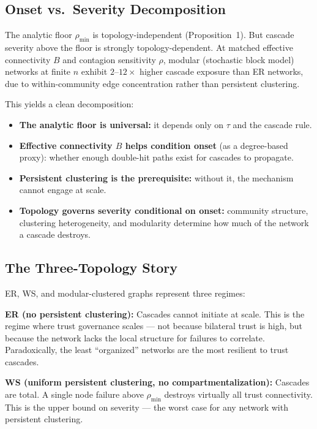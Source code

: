 \documentclass[11pt,a4paper]{article}
\begin{document}
\subsection{Onset vs.\ Severity Decomposition}

The analytic floor $\rho_{\min}$ is topology-independent (Proposition~1). But cascade severity above the floor is strongly topology-dependent. At matched effective connectivity $B$ and contagion sensitivity $\rho$, modular (stochastic block model) networks at finite $n$ exhibit $2$--$12\times$ higher cascade exposure than ER networks, due to within-community edge concentration rather than persistent clustering.

This yields a clean decomposition:

\begin{itemize}
\item \textbf{The analytic floor is universal:} it depends only on $\tau$ and the cascade rule.
\item \textbf{Effective connectivity $B$ helps condition onset} (as a degree-based proxy): whether enough double-hit paths exist for cascades to propagate.
\item \textbf{Persistent clustering is the prerequisite:} without it, the mechanism cannot engage at scale.
\item \textbf{Topology governs severity conditional on onset:} community structure, clustering heterogeneity, and modularity determine how much of the network a cascade destroys.
\end{itemize}

\subsection{The Three-Topology Story}

ER, WS, and modular-clustered graphs represent three regimes:

\textbf{ER (no persistent clustering):} Cascades cannot initiate at scale. This is the regime where trust governance scales --- not because bilateral trust is high, but because the network lacks the local structure for failures to correlate. Paradoxically, the least ``organized'' networks are the most resilient to trust cascades.

\textbf{WS (uniform persistent clustering, no compartmentalization):} Cascades are total. A single node failure above $\rho_{\min}$ destroys virtually all trust connectivity. This is the upper bound on severity --- the worst case for any network with persistent clustering.
\end{document}

